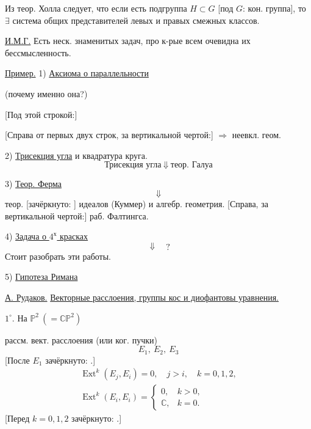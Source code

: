 Из теор. Холла следует, что если есть подгруппа $H\subset G$
[под $G$: кон. группа],
то $\exists$ система общих представителей левых и правых
смежных классов.

\underline{И.М.Г.} Есть неск. знаменитых задач, про к-рые всем очевидна
их бессмысленность.

\underline{Пример.} 1) \underline{Аксиома о параллельности}

(почему именно она?)

[Под этой строкой:] 

[Справа от первых двух строк, за вертикальной чертой:]
$\Rightarrow$ неевкл. геом.

2) \underline{Трисекция угла} и квадратура круга.
\begin{equation*}
\text{Трисекция угла}\ \Downarrow\ \text{теор. Галуа}
\end{equation*}

3) \underline{Теор. Ферма}
\begin{equation*}
\Downarrow
\end{equation*}
теор. [зачёркнуто: ] идеалов (Куммер)
и алгебр. геометрия.
[Справа, за вертикальной чертой:] раб. Фалтингса.

4) \underline{Задача о $4^{\text{х}}$ красках}
\begin{equation*}
\Downarrow\quad ?
\end{equation*}
Стоит разобрать эти работы.

5) \underline{Гипотеза Римана}



\underline{А. Рудаков.}\quad
\underline{Векторные расслоения, группы кос и диофантовы уравнения.}

$1^{\circ}$. На $\mathbb{P}^{2}\ (= \mathbb{C}\mathbb{P}^{2})$

рассм. вект. расслоения (или ког. пучки)
\begin{equation*}
E_1,\ E_2,\ E_3 \tag{1}
\end{equation*}
[После $E_1$ зачёркнуто: .]
\begin{equation*}
\begin{gathered}
\operatorname{Ext}^{k}(E_j,E_i)=0,\quad j>i,\quad k=0,1,2,\\
\operatorname{Ext}^{k}(E_i,E_i)=
\begin{cases}
0,& k>0,\\
\mathbb{C},& k=0.
\end{cases}
\end{gathered}
\tag{2}
\end{equation*}
[Перед $k=0,1,2$ зачёркнуто: .]

